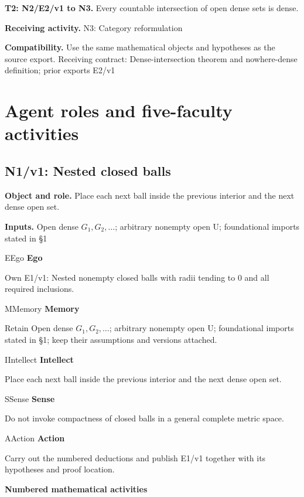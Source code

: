 \documentclass[preprint,12pt,aps,pra,showkeys,amsmath,amssymb,superscriptaddress,floatfix]{revtex4-2}
\theoremstyle{definition}
\theoremstyle{remark}
\newcommand{\mmfaculty}[3]{%
 \begin{mmfacultybox}{#1}{#2}
 {\sffamily\bfseries\color{MMBlue}#2}\par\smallskip #3
 \end{mmfacultybox}}
\newcommand{\field}[2]{\par\smallskip\noindent\textbf{#1.} #2\par}
\begin{document}
\field{T2: N2/E2/v1 to N3}{Every countable intersection of open dense sets is dense.}

\field{Receiving activity}{N3: Category reformulation}

\field{Compatibility}{Use the same mathematical objects and hypotheses as the source export.
Receiving contract: Dense-intersection theorem and nowhere-dense
definition; prior exports E2/v1}

\endgroup

\clearpage\section{Agent roles and five-faculty activities}\begingroup\small\linespread{1.05}\selectfont{}

\subsection{N1/v1: Nested closed balls}

\field{Object and role}{Place each next ball inside the previous interior and the next dense
open set.}

\field{Inputs}{Open dense \(G_{1},G_{2},\ldots\); arbitrary nonempty open U;
foundational imports stated in §1}

\mmfaculty{E}{Ego}{Own E1/v1: Nested nonempty closed balls with radii tending to 0 and all
required inclusions.}

\mmfaculty{M}{Memory}{Retain Open dense \(G_{1},G_{2},\ldots\); arbitrary nonempty open U;
foundational imports stated in §1; keep their assumptions and versions
attached.}

\mmfaculty{I}{Intellect}{Place each next ball inside the previous interior and the next dense
open set.}

\mmfaculty{S}{Sense}{Do not invoke compactness of closed balls in a general complete metric
space.}

\mmfaculty{A}{Action}{Carry out the numbered deductions and publish E1/v1 together with its
hypotheses and proof location.}

\smallskip\noindent\textbf{Numbered mathematical activities}
\end{document}
